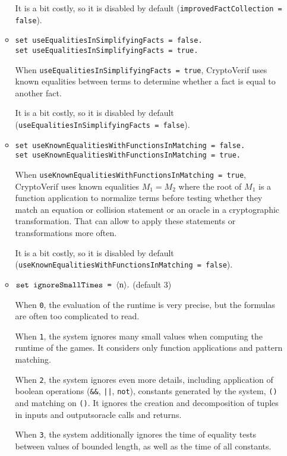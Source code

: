 \begin{itemize}
\begin{itemize}
It is a bit costly, so it is disabled by default
(\texttt{improvedFactCollection = false}).

\item \texttt{set useEqualitiesInSimplifyingFacts = false.}\\
\texttt{set useEqualitiesInSimplifyingFacts = true.}

When \texttt{useEqualitiesInSimplifyingFacts = true}, CryptoVerif
uses known equalities between terms to determine whether a fact
is equal to another fact.

It is a bit costly, so it is disabled by default
(\texttt{useEqualitiesInSimplifyingFacts = false}).

\item \texttt{set useKnownEqualitiesWithFunctionsInMatching = false.}\\
\texttt{set useKnownEqualitiesWithFunctionsInMatching = true.}

When \texttt{useKnownEqualitiesWithFunctionsInMatching = true}, CryptoVerif
uses known equalities $M_1 = M_2$ where the root of $M_1$ is a function 
application to normalize terms before testing whether they match
an equation or collision statement or an oracle in a cryptographic
transformation. That can allow to apply these statements or transformations
more often.

It is a bit costly, so it is disabled by default
(\texttt{useKnownEqualitiesWithFunctionsInMatching = false}).

\item $\texttt{set ignoreSmallTimes = }\langle\textrm{n}\rangle{\tt .}$ (default 3)

When {\tt 0}, the evaluation of the runtime is very precise,
but the formulas are often too complicated to read.

When {\tt 1}, the system ignores many small values when computing
the runtime of the games. It considers only function applications
and pattern matching.

When {\tt 2}, the system ignores even more details, including
application of boolean operations (\texttt{\&\&},
\texttt{\string|\string|}, \texttt{not}), constants generated by the
system, \texttt{()} and matching on \texttt{()}. It ignores the
creation and decomposition of tuples in \ifchannels
inputs and outputs\else oracle calls and returns\fi.

When {\tt 3}, the system additionally ignores the time of equality
tests between values of bounded length, as well as the time of
all constants.


\end{itemize}
\end{itemize}
